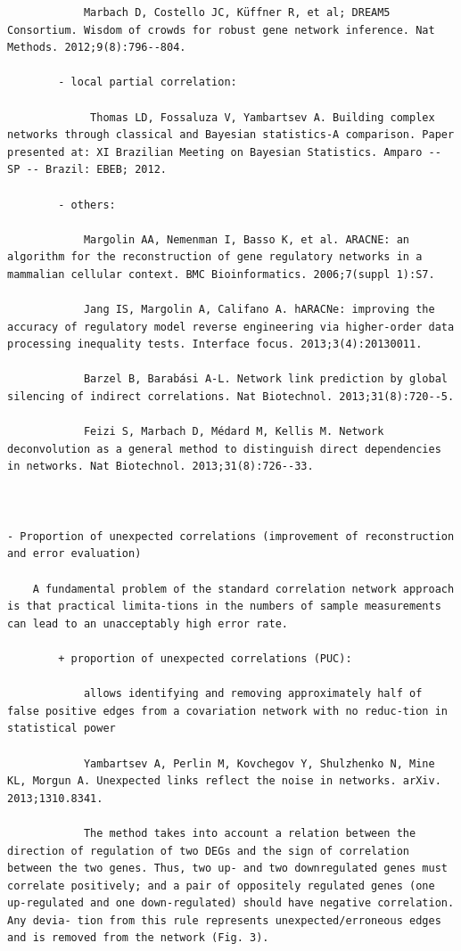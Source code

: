 \documentclass[
]{book}
\begin{document}
\begin{verbatim}
            Marbach D, Costello JC, Küffner R, et al; DREAM5 Consortium. Wisdom of crowds for robust gene network inference. Nat Methods. 2012;9(8):796--804.

        - local partial correlation:

             Thomas LD, Fossaluza V, Yambartsev A. Building complex networks through classical and Bayesian statistics-A comparison. Paper presented at: XI Brazilian Meeting on Bayesian Statistics. Amparo -- SP -- Brazil: EBEB; 2012.

        - others:

            Margolin AA, Nemenman I, Basso K, et al. ARACNE: an algorithm for the reconstruction of gene regulatory networks in a mammalian cellular context. BMC Bioinformatics. 2006;7(suppl 1):S7.

            Jang IS, Margolin A, Califano A. hARACNe: improving the accuracy of regulatory model reverse engineering via higher-order data processing inequality tests. Interface focus. 2013;3(4):20130011.

            Barzel B, Barabási A-L. Network link prediction by global silencing of indirect correlations. Nat Biotechnol. 2013;31(8):720--5.

            Feizi S, Marbach D, Médard M, Kellis M. Network deconvolution as a general method to distinguish direct dependencies in networks. Nat Biotechnol. 2013;31(8):726--33.



- Proportion of unexpected correlations (improvement of reconstruction and error evaluation)

    A fundamental problem of the standard correlation network approach is that practical limita-tions in the numbers of sample measurements can lead to an unacceptably high error rate.

        + proportion of unexpected correlations (PUC):

            allows identifying and removing approximately half of false positive edges from a covariation network with no reduc-tion in statistical power

            Yambartsev A, Perlin M, Kovchegov Y, Shulzhenko N, Mine KL, Morgun A. Unexpected links reflect the noise in networks. arXiv. 2013;1310.8341.

            The method takes into account a relation between the direction of regulation of two DEGs and the sign of correlation between the two genes. Thus, two up- and two downregulated genes must correlate positively; and a pair of oppositely regulated genes (one up-regulated and one down-regulated) should have negative correlation. Any devia- tion from this rule represents unexpected/erroneous edges and is removed from the network (Fig. 3).


\end{verbatim}
\end{document}
